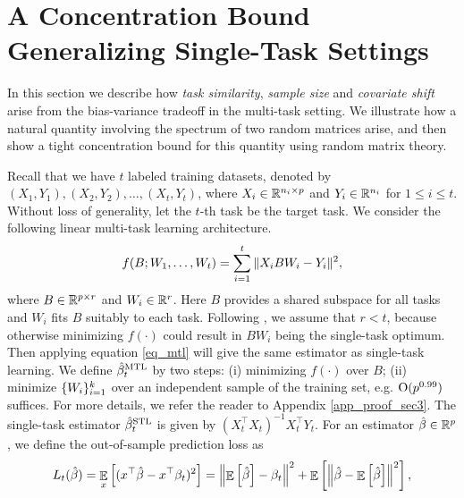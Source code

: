 \section{A Concentration Bound Generalizing Single-Task Settings}
\label{sec_main}

In this section we describe how \textit{task similarity}, \textit{sample size} and \textit{covariate shift} arise from the bias-variance tradeoff in the multi-task setting.
We illustrate how a natural quantity involving the spectrum of two random matrices arise, and then show a tight concentration bound for this quantity using random matrix theory.

Recall that we have $t$ labeled training datasets, denoted by $(X_1, Y_1), (X_2, Y_2), \dots, (X_t, Y_t)$, where $X_i\in\mathbb{R}^{n_i\times p}$ and $Y_i\in\mathbb{R}^{n_i}$ for $1\le i\le t$.
Without loss of generality, let the $t$-th task be the target task.
We consider the following linear multi-task learning architecture.
\begin{align}
	\label{eq_mtl}
	f(B; W_1, \dots, W_t) = \sum_{i=1}^t \|X_i B W_i - Y_i\|^2,
\end{align}
where $B\in\mathbb{R}^{p\times r}$ and $W_i\in\mathbb{R}^r$.
Here $B$ provides a shared subspace for all tasks and $W_i$ fits $B$ suitably to each task.
Following \cite{WZR20}, we assume that $r < t$, because otherwise minimizing $f(\cdot)$ could result in $BW_i$ being the single-task optimum.
Then applying equation \eqref{eq_mtl} will give the same estimator as single-task learning.
We define $\hat{\beta}_t^{\text{MTL}}$ by two steps:
(i) minimizing $f(\cdot)$ over $B$;
(ii) minimize $\{W_i\}_{i=1}^k$ over an independent sample of the training set, e.g. $\operatorname{O}(p^{0.99})$ suffices.
For more details, we refer the reader to Appendix \ref{app_proof_sec3}. The single-task estimator $\hat{\beta}_t^{\text{STL}}$ is given by $(X_t^{\top}X_t)^{-1}X_t^{\top}Y_t$. 
For an estimator $\hat{\beta}\in\mathbb{R}^p$, we define the out-of-sample prediction loss as
	\begin{align*}
		L_t(\hat{\beta}) = \mathop{\mathbb{E}}_{x}\left[ ({x}^{\top}\hat{\beta} - {x}^{\top}\beta_t)^2 \right]
		= \left\| \mathop{\mathbb{E}}\left[ \hat{\beta} \right] - \beta_t \right\|^2 + \mathop{\mathbb{E}}\left[ \left\| \hat{\beta} - \mathop{\mathbb{E}}\left[ \hat{\beta} \right] \right\|^2 \right],
	\end{align*}
